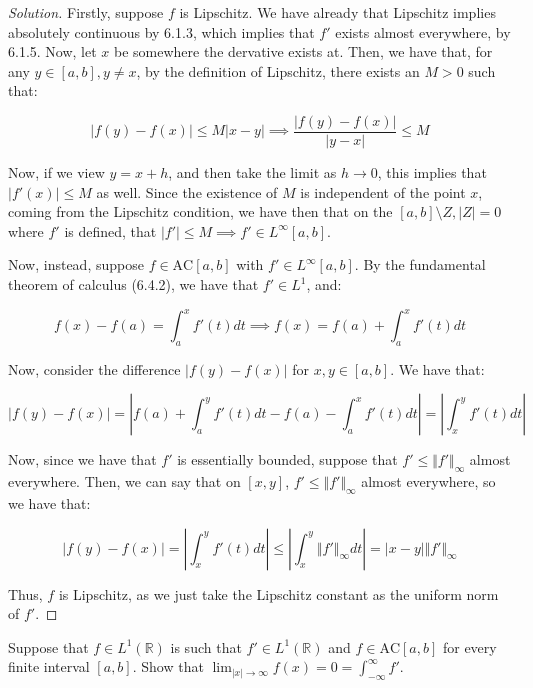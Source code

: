 \documentclass[10pt]{article}
\newcommand{\ac}{{\text{AC}}}
\newenvironment{problem}[2][Problem]{\begin{trivlist}
\item[\hskip \labelsep {\bfseries #1}\hskip \labelsep {\bfseries #2.}]}{\end{trivlist}}
\begin{document}
\begin{proof}[Solution]

Firstly, suppose $f$ is Lipschitz. We have already that Lipschitz implies absolutely continuous by 6.1.3, which implies that $f'$ exists almost everywhere, by 6.1.5. Now, let $x$ be somewhere the dervative exists at. Then, we have that, for any $y \in [a,b], y \not = x$, by the definition of Lipschitz, there exists an $M > 0$ such that:

$$ | f(y) - f(x) | \leq M | x - y| \implies \frac{|f(y)- f(x)|}{|y-x|} \leq M $$

Now, if we view $y = x+h$, and then take the limit as $h \to 0$, this implies that $|f'(x)| \leq M$ as well. Since the existence of $M$ is independent of the point $x$, coming from the Lipschitz condition, we have then that on the $[a,b] \setminus Z, |Z|= 0$ where $f'$ is defined, that $|f' | \leq M \implies f' \in L^\infty[a,b]$.

Now, instead, suppose $f \in \ac[a,b]$ with $f' \in L^\infty[a,b]$. By the fundamental theorem of calculus (6.4.2), we have that $f' \in L^1$, and:

$$ f(x) - f(a) = \int_a^x f'(t) dt  \implies f(x) = f(a) + \int_a^x f'(t)dt$$

Now, consider the difference $| f(y) - f(x) |$ for $x,y \in [a,b]$. We have that:

$$ | f(y) - f(x) |  = | f(a) + \int_a^y f'(t) dt - f(a) - \int_a^x f'(t) dt | = | \int_x^y f'(t) dt |$$

Now, since we have that $f'$ is essentially bounded, suppose that $f' \leq \Vert f' \Vert_\infty$ almost everywhere. Then, we can say that on $[x,y]$, $f' \leq \Vert f' \Vert_\infty$ almost everywhere, so we have that:

$$ |f(y) - f(x)| =  | \int_x^y f'(t) dt | \leq | \int_x^y \Vert f' \Vert_\infty dt | = |x - y| \Vert f' \Vert_\infty $$

Thus, $f$ is Lipschitz, as we just take the Lipschitz constant as the uniform norm of $f'$.

\end{proof}

\begin{problem}{6.4.13}

Suppose that $f \in L^1(\mathbb{R})$ is such that $f'\in L^1(\mathbb{R})$ and $ f \in \ac[a,b]$ for every finite interval $[a,b]$. Show that $\lim_{|x| \to \infty} f(x) = 0 = \int_{-\infty}^\infty f'$. 

\end{problem}
\end{document}
